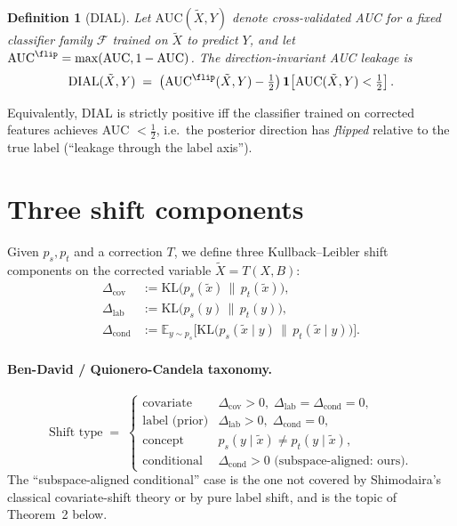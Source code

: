 \documentclass[11pt,a4paper]{article}
\newtheorem{definition}{Definition}
\newcommand{\E}{\mathbb{E}}
\newcommand{\KL}{\mathrm{KL}}
\begin{document}
\begin{definition}[DIAL]
\label{def:dial}
Let $\mathrm{AUC}(\tilde X,Y)$ denote cross-validated AUC for a fixed
classifier family $\mathcal{F}$ trained on $\tilde X$ to predict $Y$,
and let $\mathrm{AUC}^{\flip}=\max(\mathrm{AUC},1-\mathrm{AUC})$. The
\emph{direction-invariant AUC leakage} is
\[
  \mathrm{DIAL}(\tilde X,Y) \;=\; \bigl(\mathrm{AUC}^{\flip}
  (\tilde X,Y)-\tfrac12\bigr)\,\mathbf{1}\!\left[\mathrm{AUC}
  (\tilde X,Y)<\tfrac12\right].
\]
\end{definition}

Equivalently, DIAL is strictly positive iff the classifier trained on
corrected features achieves AUC $<\tfrac12$, i.e.\ the posterior
direction has \emph{flipped} relative to the true label (``leakage
through the label axis'').

\section{Three shift components}

Given $p_s,p_t$ and a correction $T$, we define three Kullback--Leibler
shift components on the corrected variable $\tilde X=T(X,B)$:
\begin{align}
  \Delta_{\text{cov}} &:= \KL\!\bigl(p_s(\tilde x)\,\|\,p_t(\tilde x)\bigr),
    \label{eq:cov}\\[2pt]
  \Delta_{\text{lab}} &:= \KL\!\bigl(p_s(y)\,\|\,p_t(y)\bigr),
    \label{eq:lab}\\[2pt]
  \Delta_{\text{cond}} &:= \E_{y\sim p_s}\bigl[\KL\!\bigl(
      p_s(\tilde x\mid y)\,\|\,p_t(\tilde x\mid y)\bigr)\bigr].
    \label{eq:cond}
\end{align}

\paragraph{Ben-David / Quionero-Candela taxonomy.}
\[
  \text{Shift type} \;=\;
    \begin{cases}
      \text{covariate}   & \Delta_{\text{cov}}>0,\; \Delta_{\text{lab}}=\Delta_{\text{cond}}=0,\\
      \text{label (prior)}     & \Delta_{\text{lab}}>0,\; \Delta_{\text{cond}}=0,\\
      \text{concept}     & p_s(y\mid \tilde x)\neq p_t(y\mid \tilde x),\\
      \text{conditional} & \Delta_{\text{cond}}>0 \text{ (subspace-aligned: ours).}
    \end{cases}
\]
The ``subspace-aligned conditional'' case is the one not covered by
Shimodaira's classical covariate-shift theory or by pure label shift,
and is the topic of Theorem~2 below.
\end{document}
